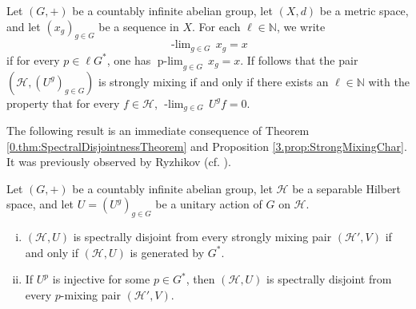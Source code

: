 \documentclass[graybox]{svmult}
\theoremstyle{definition}
\newcommand{\N}{\mathbb{N}}
\newcommand{\plimgG}[3]{\mathop {#1\text{-lim}}_{#2\in #3}\,}
\begin{document}
\begin{remark}
    Let $(G,+)$ be a countably infinite abelian group, let $(X,d)$ be a metric space, and let $(x_g)_{g\in G}$ be a sequence in $X$. For each $\ell\in\N$, we write
    $$
\mathop{\Sigma_\ell^*\text{-lim}}_{g\in G}\,x_g=x
    $$
    if for every $p\in \ell G^*$, one has $\plimgG{p}{g}{G}x_g=x$. 
    If follows that the pair $(\mathcal H,(U^g)_{g\in G})$ is strongly mixing if and only if there exists an $\ell\in\N$ with the property that for every $f\in\mathcal H$, $
\mathop{\Sigma_\ell^*\text{-lim}}_{g\in G}\,U^gf=0$.
\end{remark}
The following result is an immediate consequence of Theorem \ref{0.thm:SpectralDisjointnessTheorem} and Proposition \ref{3.prop:StrongMixingChar}.
It was previously observed by Ryzhikov (cf. \cite[Remark 1]{SpectrumOfAlphaRigidMaps}).
\begin{corollary}\label{cor:SpectralDisjointnessFromSM}
    Let $(G,+)$ be a countably infinite abelian group, let $\mathcal H$ be a separable Hilbert space, and let $U = (U^g)_{g \in G}$ be a unitary action of $G$ on $\mathcal{H}$.
    \begin{enumerate}[(i)]
        \item $(\mathcal{H},U)$ is spectrally disjoint from every strongly mixing pair $(\mathcal{H}',V)$ if and only if $(\mathcal{H},U)$ is generated by $G^*$.
        \item If $U^p$ is injective for some $p \in G^*$, then $(\mathcal{H},U)$ is spectrally disjoint from every $p$-mixing pair $(\mathcal{H}',V)$.
    \end{enumerate}
\end{corollary}
\end{document}
